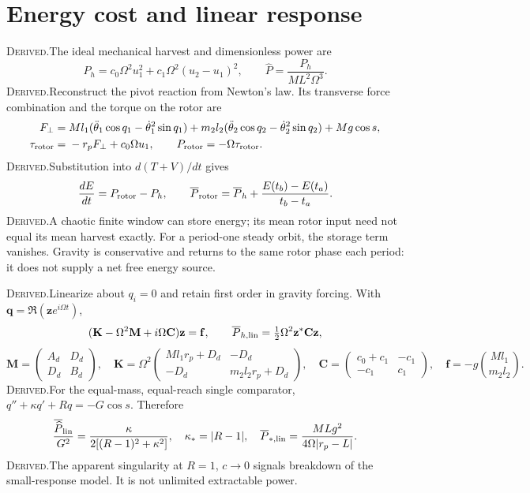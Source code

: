 \documentclass[10pt,a4paper]{article}
\newcommand{\D}{\textcolor{accent}{\textsc{Derived.}}\enspace}
\newcommand{\page}[1]{\clearpage\section{#1}}
\begin{document}
\page{Energy cost and linear response}
\D The ideal mechanical harvest and dimensionless power are
\begin{equation}
P_h=c_0\Omega^2u_1^2+c_1\Omega^2(u_2-u_1)^2,\qquad \widehat P=\frac{P_h}{ML^2\Omega^3}.
\end{equation}
\D Reconstruct the pivot reaction from Newton's law. Its transverse force combination and the torque on the rotor are
\begin{align}
F_\perp={}&Ml_1(\ddot\theta_1\cos q_1-\dot\theta_1^2\sin q_1)
+m_2l_2(\ddot\theta_2\cos q_2-\dot\theta_2^2\sin q_2)+Mg\cos s,\\
\tau_{\rm rotor}={}&-r_pF_\perp+c_0\Omega u_1,\qquad P_{\rm rotor}=-\Omega\tau_{\rm rotor}.
\end{align}
\D Substitution into $d(T+V)/dt$ gives
\begin{equation}
\frac{dE}{dt}=P_{\rm rotor}-P_h,\qquad
\overline P_{\rm rotor}=\overline P_h+\frac{E(t_b)-E(t_a)}{t_b-t_a}.
\end{equation}
\D A chaotic finite window can store energy; its mean rotor input need not equal its mean harvest exactly. For a period-one steady orbit, the storage term vanishes. Gravity is conservative and returns to the same rotor phase each period: it does not supply a net free energy source.

\D Linearize about $q_i=0$ and retain first order in gravity forcing. With $\mathbf q=\Re(\mathbf z e^{i\Omega t})$,
\begin{equation}
(\mathbf K-\Omega^2\mathbf M+i\Omega\mathbf C)\mathbf z=\mathbf f,
\qquad \overline P_{h,\rm lin}=\tfrac12\Omega^2\mathbf z^*\mathbf C\mathbf z,
\end{equation}
\begin{equation}
\mathbf M=\begin{pmatrix}A_d&D_d\\D_d&B_d\end{pmatrix},\quad
\mathbf K=\Omega^2\begin{pmatrix}Ml_1r_p+D_d&-D_d\\-D_d&m_2l_2r_p+D_d\end{pmatrix},\quad
\mathbf C=\begin{pmatrix}c_0+c_1&-c_1\\-c_1&c_1\end{pmatrix},\quad
\mathbf f=-g\binom{Ml_1}{m_2l_2}.
\end{equation}
\D For the equal-mass, equal-reach single comparator, $q''+\kappa q'+Rq=-G\cos s$. Therefore
\begin{equation}
\frac{\overline{\widehat P}_{\rm lin}}{G^2}=\frac{\kappa}{2[(R-1)^2+\kappa^2]},\quad
\kappa_* = |R-1|,\quad
\overline P_{*,\rm lin}=\frac{MLg^2}{4\Omega|r_p-L|}.
\end{equation}
\D The apparent singularity at $R=1$, $c\to0$ signals breakdown of the small-response model. It is not unlimited extractable power.
\end{document}
